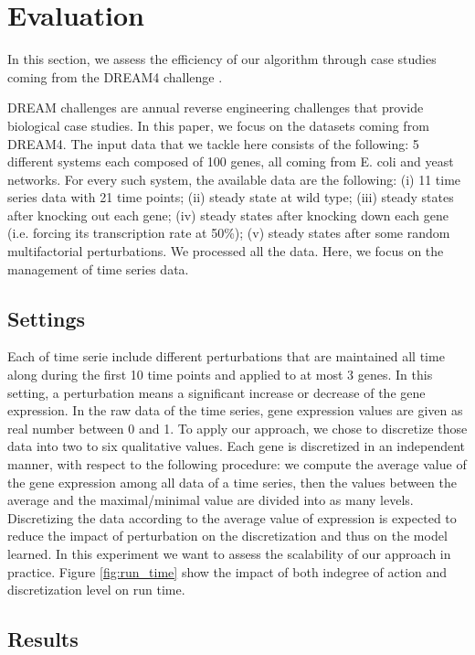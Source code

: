 \section{Evaluation}
	\label{sec:evaluation}
	
	In this section, we assess the efficiency of our algorithm through case studies coming from the DREAM4 challenge \cite{prill2011crowdsourcing}.

	DREAM challenges are annual reverse engineering challenges that provide biological case studies.
	In this paper, we focus on the datasets coming from DREAM4.
	The input data that we tackle here consists of the following:
	5 different systems each composed of 100 genes, all coming from E. coli and yeast networks. For every such system,
	the available data are the following: (i) 11 time series data with 21 time points; (ii) steady state at wild type;
	(iii) steady states after knocking out each gene;
	(iv) steady states after knocking down each gene (i.e. forcing its transcription rate at 50\%);
	(v) steady states after some random multifactorial perturbations. We processed all the data.
	Here, we focus on the management of time series data.

\subsection{Settings}

	Each of time serie include different perturbations that are maintained all time along during the first 10 time points and applied to at most 3 genes.
	In this setting, a perturbation means a significant increase or decrease of the gene expression.
	In the raw data of the time series, gene expression values are given as real number between 0 and 1.
	To apply our approach, we chose to discretize those data into two to six qualitative values.
	Each gene is discretized in an independent manner, with respect to the following procedure:
	we compute the average value of the gene expression among all data of a time series,
	then the values between the average and the maximal/minimal value are divided into as many levels.
	Discretizing the data according to the average value of expression is expected to reduce the impact of perturbation on the discretization and thus on the model learned.
	In this experiment we want to assess the scalability of our approach in practice.
	Figure \ref{fig:run_time} show the impact of both indegree of action and discretization level on run time.

\subsection{Results}


